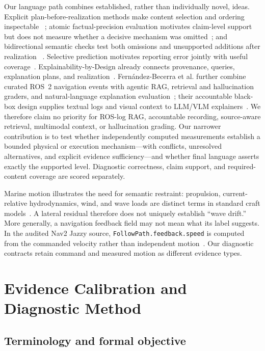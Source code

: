 \documentclass[conference]{IEEEtran}
\begin{document}
Our language path combines established, rather than individually novel, ideas. Explicit
plan-before-realization methods make content selection and ordering inspectable
~\cite{moryossef2019step}; atomic factual-precision evaluation motivates claim-level support but
does not measure whether a decisive mechanism was omitted~\cite{min2023factscore}; and
bidirectional semantic checks test both omissions and unsupported additions after realization
~\cite{dusek2020semantic}. Selective prediction motivates reporting error jointly with useful
coverage~\cite{geifman2019selectivenet}. Explainability-by-Design already connects provenance,
queries, explanation plans, and realization~\cite{huynh2023explainability}. Fern\'andez-Becerra
et al. further combine curated ROS~2 navigation events with agentic RAG, retrieval and
hallucination graders, and natural-language explanation evaluation~\cite{fernandezbecerra2026rag};
their accountable black-box design supplies textual logs and visual context to LLM/VLM
explainers~\cite{fernandezbecerra2026accountability}. We therefore claim no priority for ROS-log
RAG, accountable recording, source-aware retrieval, multimodal context, or hallucination grading.
Our narrower contribution is to test whether independently computed measurements establish a
bounded physical or execution mechanism---with conflicts, unresolved alternatives, and explicit
evidence sufficiency---and whether final language asserts exactly the supported level. Diagnostic
correctness, claim support, and required-content coverage are scored separately.

Marine motion illustrates the need for semantic restraint: propulsion, current-relative
hydrodynamics, wind, and wave loads are distinct terms in standard craft models~\cite{fossen2021handbook}.
A lateral residual therefore does not uniquely establish ``wave drift.'' More generally, a
navigation feedback field may not mean what its label suggests. In the audited Nav2 Jazzy source,
\texttt{FollowPath.feedback.speed} is computed from the commanded velocity rather than independent
motion~\cite{nav2controller}. Our diagnostic contracts retain command and measured motion as
different evidence types.

\section{Evidence Calibration and Diagnostic Method}

\subsection{Terminology and formal objective}
\end{document}
